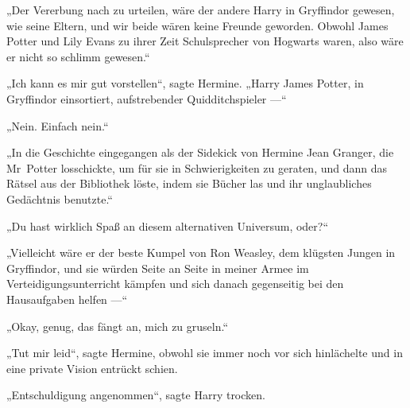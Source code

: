 „Der Vererbung nach zu urteilen, wäre der andere Harry in Gryffindor gewesen, wie seine Eltern, und wir beide wären keine Freunde geworden. Obwohl James Potter und Lily Evans zu ihrer Zeit Schulsprecher von Hogwarts waren, also wäre er nicht so schlimm gewesen.“

„Ich kann es mir gut vorstellen“, sagte Hermine.
„Harry James Potter, in Gryffindor einsortiert, aufstrebender Quidditchspieler —“

„Nein. Einfach nein.“

„In die Geschichte eingegangen als der Sidekick von Hermine Jean Granger, die Mr~Potter losschickte, um für sie in Schwierigkeiten zu geraten, und dann das Rätsel aus der Bibliothek löste, indem sie Bücher las und ihr unglaubliches Gedächtnis benutzte.“

„Du hast wirklich Spaß an diesem alternativen Universum, oder?“

„Vielleicht wäre er der beste Kumpel von Ron Weasley, dem klügsten Jungen in Gryffindor, und sie würden Seite an Seite in meiner Armee im Verteidigungsunterricht kämpfen und sich danach gegenseitig bei den Hausaufgaben helfen —“

„Okay, genug, das fängt an, mich zu gruseln.“

„Tut mir leid“, sagte Hermine, obwohl sie immer noch vor sich hinlächelte und in eine private Vision entrückt schien.

„Entschuldigung angenommen“, sagte Harry trocken.

